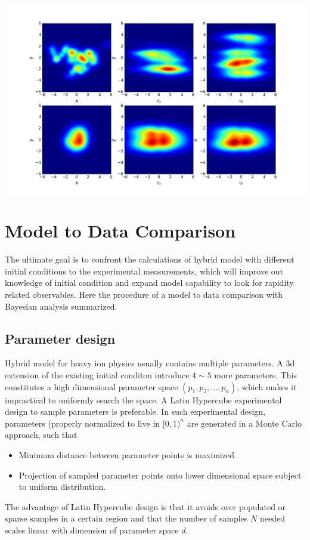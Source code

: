 \documentclass[aps,prl,twocolumn,groupedaddress]{revtex4-1}
\begin{document}
	\includegraphics[width=1.0\columnwidth]{pics/3d-example.png}\label{3d-example}

\section{Model to Data Comparison}
	The ultimate goal is to confront the calculations of hybrid model with different initial conditions to the experimental measurements, which will improve out knowledge of initial condition and expand model capability to look for rapidity related observables.
	Here the procedure of a model to data comparison with Bayesian analysis summarized. 
	\subsection{Parameter design} 
	Hybrid model for heavy ion physics usually contains multiple parameters. 
	A 3d extension of the existing initial conditon introduce $4\sim5$ more parameters. 
	This constitutes a high dimensional parameter space $(p_1, p_2, ..., p_n)$, which makes it impractical to uniformly search the space. 
	A Latin Hypercube experimental design to sample parameters is preferable. 
	In such experimental design, parameters (properly normalized to live in $[0,1)^n$ are generated in a Monte Carlo approach, such that
	\begin{itemize}
		\item Minimum distance between parameter points is maximized.
		\item Projection of sampled parameter points onto lower dimensional space subject to uniform distribution.
	\end{itemize}
	The advantage of Latin Hypercube design is that it avoids over populated or sparse samples in a certain region and that the number of samples $N$ needed scales linear with dimension of parameter space $d$.
	
\end{document}
